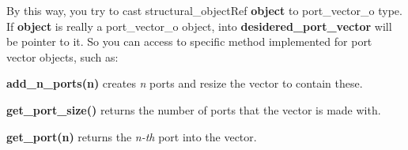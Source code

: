 By this way, you try to cast structural\+\_\+object\+Ref {\bfseries object} to port\+\_\+vector\+\_\+o type. If {\bfseries object} is really a port\+\_\+vector\+\_\+o object, into {\bfseries desidered\+\_\+port\+\_\+vector} will be pointer to it. So you can access to specific method implemented for port vector objects, such as\+:
\begin{DoxyItemize}
\item {\bfseries add\+\_\+n\+\_\+ports(n)} creates {\itshape n} ports and resize the vector to contain these.
\item {\bfseries get\+\_\+port\+\_\+size()} returns the number of ports that the vector is made with.
\item {\bfseries get\+\_\+port(n)} returns the {\itshape n-\/th} port into the vector.
\end{DoxyItemize}

